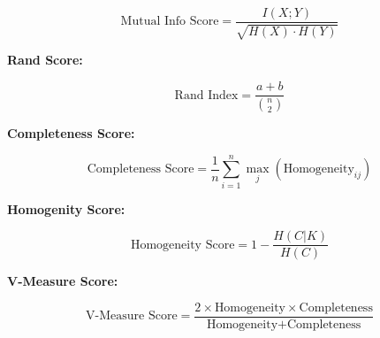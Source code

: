 \[\text{Mutual Info Score} = \frac{I(X;Y)}{\sqrt{H(X) \cdot H(Y)}}\]

\textbf{Rand Score:}

\[\text{Rand Index} = \frac{a + b}{\binom{n}{2}}\]

\textbf{Completeness Score:}

\[\text{Completeness Score} = \frac{1}{n} \sum_{i=1}^{n} \max_j (\text{Homogeneity}_{ij})\]

\textbf{Homogenity Score:}

\[\text{Homogeneity Score} = 1 - \frac{H(C|K)}{H(C)}\]

\textbf{V-Measure Score:}

\[\text{V-Measure Score} = \frac{2 \times \text{Homogeneity} \times \text{Completeness}}{\text{Homogeneity} + \text{Completeness}}\]

\newpage